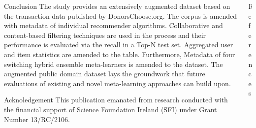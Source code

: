 \documentclass[final]{beamer}
\begin{document}
\begin{frame}[t,fragile=singleslide]{}
	\begin{columns}[t]
		\begin{column}{0.45\textwidth}
			\begin{block}{Conclusion}
				The study provides an extensively augmented dataset based on the transaction data published by DonorsChoose.org. The corpus is amended with metadata of individual recommender algorithms. Collaborative and content-based filtering techniques are used in the process and their performance is evaluated via the recall in a Top-N test set. Aggregated user and item statistics are amended to the table. Furthermore, Metadata of four switching hybrid ensemble meta-learners is amended to the dataset. The augmented public domain dataset lays the groundwork that future evaluations of existing and novel meta-learning approaches can build upon.
			\end{block}

			\begin{block}{Acknoledgement}
				\footnotesize
				This publication emanated from research conducted with the financial support of Science Foundation Ireland (SFI) under Grant Number 13/RC/2106.
			\end{block}
		\end{column}

		\begin{column}{0.45\textwidth}
			\begin{block}{References}
				\printbibliography[heading=none]
			\end{block}
		\end{column}
	\end{columns}
\end{frame}
\end{document}
